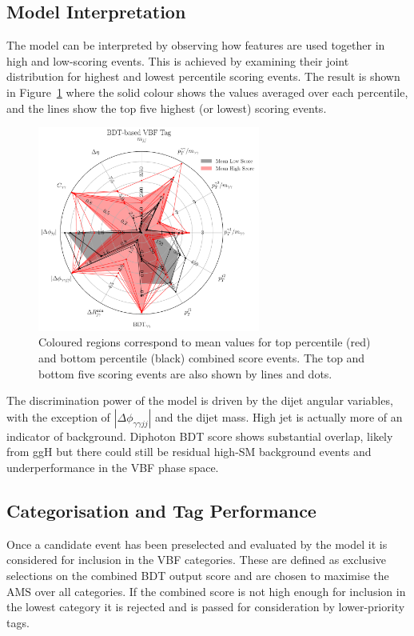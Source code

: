 \subsection{Model Interpretation}
The model can be interpreted by observing how features are used together in high and low-scoring events. This is achieved by examining their joint distribution for highest and lowest percentile scoring events. 
The result is shown in Figure~\ref{fig:event_categorisaton:bdt_based_vbf_tag_interpretation} where the solid colour shows the values averaged over each percentile, and the lines show the top five highest (or lowest) scoring events.
\begin{figure}[h!]
    \centering
    \includegraphics[width=0.65\textwidth]{figures/event_selection/eng_feature_radar_BDT.pdf}
    \caption{Coloured regions correspond to mean values for top percentile (red) and bottom percentile (black) combined score events. 
             The top and bottom five scoring events are also shown by lines and dots.}
    \label{fig:event_categorisaton:bdt_based_vbf_tag_interpretation}
\end{figure}

The discrimination power of the model is driven by the dijet angular variables, with the exception of $|\Delta\phi_{\gamma\gamma{jj}}|$ and the dijet mass.
High jet \pt is actually more of an indicator of background.
Diphoton BDT score shows substantial overlap, likely from ggH but there could still be residual high-\pt SM background events and underperformance in the VBF phase space.


\subsection{Categorisation and Tag Performance}
Once a candidate event has been preselected and evaluated by the model it is considered for inclusion in the VBF categories. 
These are defined as exclusive selections on the combined BDT output score and are chosen to maximise the $\mathrm{AMS}$ over all categories. 
If the combined score is not high enough for inclusion in the lowest category it is rejected and is passed for consideration by lower-priority tags. 

